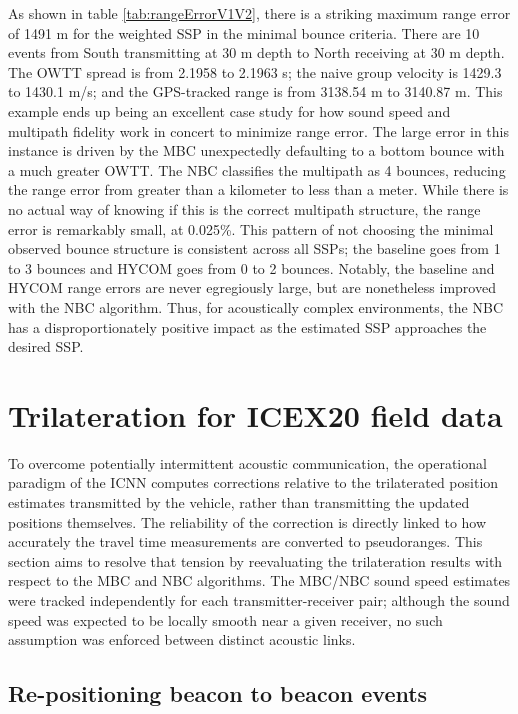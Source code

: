 As shown in table \ref{tab:rangeErrorV1V2}, there is a striking maximum range error of 1491 m for the weighted SSP in the minimal bounce criteria.
There are 10 events from South transmitting at 30 m depth to North receiving at 30 m depth.
The OWTT spread is from 2.1958 to 2.1963 s; the naive group velocity is 1429.3 to 1430.1 m/s; and the GPS-tracked range is from 3138.54 m to 3140.87 m.
This example ends up being an excellent case study for how sound speed and multipath fidelity work in concert to minimize range error.
The large error in this instance is driven by the MBC unexpectedly defaulting to a bottom bounce with a much greater OWTT.
The NBC classifies the multipath as 4 bounces, reducing the range error from greater than a kilometer to less than a meter.
While there is no actual way of knowing if this is the correct multipath structure, the range error is remarkably small, at 0.025\%. 
This pattern of not choosing the minimal observed bounce structure is consistent across all SSPs; the baseline goes from 1 to 3 bounces and HYCOM goes from 0 to 2 bounces.
Notably, the baseline and HYCOM range errors are never egregiously large, but are nonetheless improved with the NBC algorithm.
Thus, for acoustically complex environments, the NBC has a disproportionately positive impact as the estimated SSP approaches the desired SSP.

\clearpage
\section{Trilateration for ICEX20 field data}\label{sec:trilat}

To overcome potentially intermittent acoustic communication, the operational paradigm of the ICNN computes corrections relative to the trilaterated position estimates transmitted by the vehicle, rather than transmitting the updated positions themselves.
The reliability of the correction is directly linked to how accurately the travel time measurements are converted to pseudoranges.
This section aims to resolve that tension by reevaluating the trilateration results with respect to the MBC and NBC algorithms.
The MBC/NBC sound speed estimates were tracked independently for each transmitter-receiver pair; although the sound speed was expected to be locally smooth near a given receiver, no such assumption was enforced between distinct acoustic links.

\subsection{Re-positioning beacon to beacon events}

